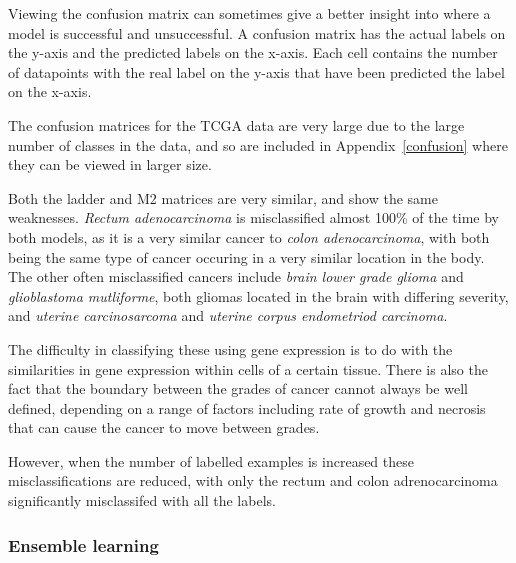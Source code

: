 Viewing the confusion matrix can sometimes give a better insight into where a model is successful and unsuccessful. A confusion
matrix has the actual labels on the y-axis and the predicted labels on the x-axis. Each cell contains the number of datapoints with the 
real label on the y-axis that have been predicted the label on the x-axis.

The confusion matrices for the TCGA data are very large due to the large number of classes in the data, and so are included in Appendix~\ref{confusion} 
where they can be viewed in larger size.

Both the ladder and M2 matrices are very similar, and show the same weaknesses. \textit{Rectum adenocarcinoma} 
is misclassified almost 
100\% of the time by both models, as it is a very similar cancer to \textit{colon adenocarcinoma}, with both being the same type of cancer
occuring in a very similar location in the body. The other often misclassified cancers include \textit{brain lower grade glioma} and 
\textit{glioblastoma mutliforme}, both gliomas located in the brain with differing severity, and \textit{uterine carcinosarcoma} and 
\textit{uterine corpus endometriod carcinoma}. 

The difficulty in classifying these using gene expression is to do with the similarities in gene expression within cells of a certain tissue.
There is also the fact that the boundary between the grades of cancer cannot always be well defined, depending on a range of factors 
including rate of growth and necrosis that can cause the cancer to move between grades.

However, when the number of labelled examples is increased these misclassifications are reduced, with only the rectum and colon adrenocarcinoma 
significantly misclassifed with all the labels.

\subsubsection{Ensemble learning} \label{ensemble}

